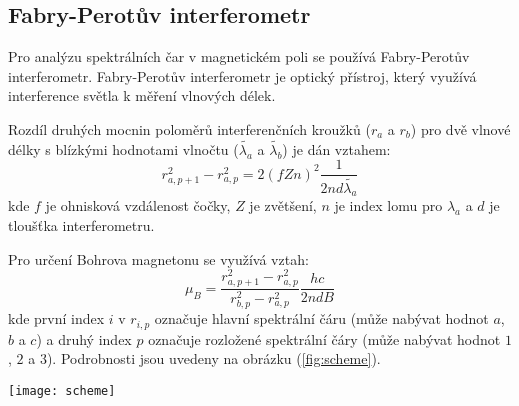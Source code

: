 \documentclass[a4paper,11pt]{article}
\begin{document}
    \begin{minipage}[t]{0.5\textwidth} 
            \subsection{Fabry-Perotův interferometr}
                Pro analýzu spektrálních čar v magnetickém poli se používá Fabry-Perotův interferometr. Fabry-Perotův interferometr je optický přístroj, který využívá interference světla k měření vlnových délek. 
                \par Rozdíl druhých mocnin poloměrů interferenčních kroužků ($r_a$ a $r_b$) pro dvě vlnové délky s blízkými hodnotami vlnočtu ($\tilde{\lambda_a}$ a $\tilde{\lambda_b}$) je dán vztahem:
                \begin{equation}
                    r_{a,p+1}^2 - r_{a,p}^2 = 2(fZn)^2 \frac{1}{2nd\tilde{\lambda_a}}
                \end{equation} 
                kde $f$ je ohnisková vzdálenost čočky, $Z$ je zvětšení, $n$ je index lomu pro $\lambda_a$ a $d$ je tloušťka interferometru.
                \par Pro určení Bohrova magnetonu se využívá vztah:
                \begin{equation}
                    \mu_B = \frac{r_{a,p+1}^2 - r_{a,p}^2}{r_{b,p}^2 - r_{a,p}^2} \frac{hc}{2ndB}
                \end{equation}
                kde první index $i$ v $r_{i,p}$ označuje hlavní spektrální čáru (může nabývat hodnot $a$, $b$ a $c$) a druhý index $p$ označuje rozložené spektrální čáry (může nabývat hodnot $1$, $2$ a $3$). Podrobnosti jsou uvedeny na obrázku (\ref{fig:scheme}).

                \vspace{10pt}   
                \par \centering
                \texttt{[image: scheme]}
                \captionsetup{justification=centering, font=footnotesize}
                \label{fig:scheme}
                \vspace{10pt}
                \raggedright 
    \end{minipage}
\newpage
\end{document}
